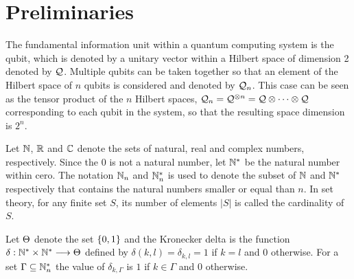 \section{Preliminaries}
The fundamental information unit within a quantum computing system is the qubit, which is denoted by a unitary vector within a Hilbert space of dimension 2 denoted by $\mathcal{Q}$.
Multiple qubits can be taken together so that an element of the Hilbert space of $n$ qubits is considered and denoted by $\mathcal{Q}_n$.
This case can be seen as the tensor product of the $n$ Hilbert spaces, $\mathcal{Q}_n=\mathcal{Q}^{\otimes n}=\mathcal{Q}\otimes\dots\otimes\mathcal{Q}$ corresponding to each qubit in the system, so that the resulting space dimension is $2^n$.

Let $\mathbb{N}$, $\mathbb{R}$ and $\mathbb{C}$ denote the sets of natural, real and complex numbers, respectively.
Since the $0$ is not a natural number, let $\mathbb{N}^*$ be the natural number within cero.
The notation $\mathbb{N}_n$ and $\mathbb{N}^*_n$ is used to denote the subset of $\mathbb{N}$ and $\mathbb{N}^*$ respectively that contains the natural numbers smaller or equal than $n$.
In set theory, for any finite set $S$, its number of elements  $|S|$ is called the cardinality of $S$.

Let $\Theta$ denote the set $\{0,1\}$ and the Kronecker delta is the function $\delta:\mathbb{N}^*\times\mathbb{N}^*\longrightarrow\Theta$ defined by $\delta(k,l)=\delta_{k,l}=1$ if $k=l$ and $0$ otherwise.
For a set $\Gamma\subseteq\mathbb{N}^*_n$ the value of $\delta_{k,\Gamma}$ is $1$ if $k\in\Gamma$ and $0$ otherwise.